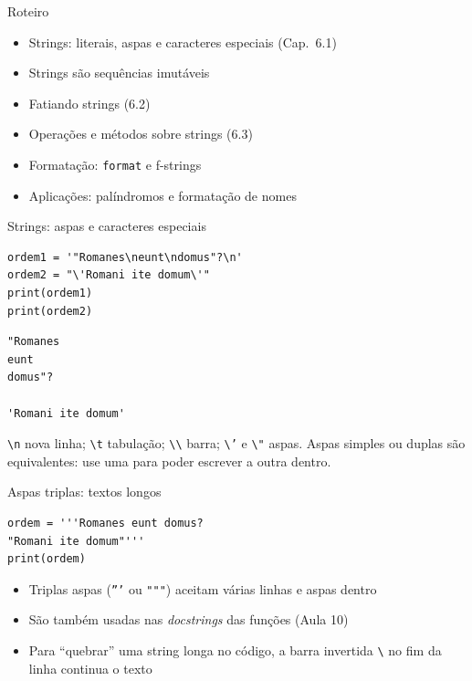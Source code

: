 \documentclass[aspectratio=169,10pt,t]{beamer}
\begin{document}
\capa

\begin{frame}{Roteiro}
  \begin{itemize}
    \item Strings: literais, aspas e caracteres especiais (Cap.~6.1)
    \item Strings são sequências \alert{imutáveis}
    \item Fatiando strings (6.2)
    \item Operações e métodos sobre strings (6.3)
    \item Formatação: \texttt{format} e f-strings
    \item Aplicações: palíndromos e formatação de nomes
  \end{itemize}
\end{frame}

\begin{frame}[fragile]{Strings: aspas e caracteres especiais}
\begin{lstlisting}
ordem1 = '"Romanes\neunt\ndomus"?\n'
ordem2 = "\'Romani ite domum\'"
print(ordem1)
print(ordem2)
\end{lstlisting}
\begin{lstlisting}[style=saida]
"Romanes
eunt
domus"?

'Romani ite domum'
\end{lstlisting}
  \small \texttt{\textbackslash n} nova linha; \texttt{\textbackslash t} tabulação; \texttt{\textbackslash\textbackslash} barra; \texttt{\textbackslash'} e \texttt{\textbackslash"} aspas. Aspas simples ou duplas são equivalentes: use uma para poder escrever a outra dentro.\\
\end{frame}

\begin{frame}[fragile]{Aspas triplas: textos longos}
\begin{lstlisting}
ordem = '''Romanes eunt domus?
"Romani ite domum"'''
print(ordem)
\end{lstlisting}
  \begin{itemize}
    \item Triplas aspas (\texttt{'''} ou \texttt{"""}) aceitam \alert{várias linhas} e aspas dentro
    \item São também usadas nas \emph{docstrings} das funções (Aula 10)
    \item Para ``quebrar'' uma string longa no código, a barra invertida \texttt{\textbackslash} no fim da linha continua o texto
  \end{itemize}
\end{frame}
\end{document}
